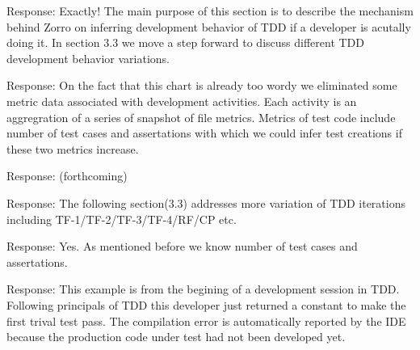 \documentclass[11pt]{article}
\begin{document}

\noindent Response: Exactly! The main purpose of this section is to describe the mechanism behind Zorro on inferring development behavior of TDD if a developer is acutally doing it. In section 3.3 we move a step forward to discuss different
TDD development behavior variations. 


\noindent Response: On the fact that this chart is already too wordy we eliminated some metric data associated with development activities. Each activity is an aggregration of a series of snapshot of file metrics. Metrics of test code include number of test cases and assertations with which we could infer test creations if these two metrics increase.


\noindent Response: (forthcoming)


\noindent Response: The following section(3.3) addresses more variation of TDD iterations including TF-1/TF-2/TF-3/TF-4/RF/CP etc. 


\noindent Response: Yes. As mentioned before we know number of test cases and assertations. 


\noindent Response: This example is from the begining of a development session in TDD. Following principals of TDD this developer just returned a constant to make the first trival test pass. The compilation error is automatically reported by the IDE because the production code under test had not been developed yet.
\end{document}
